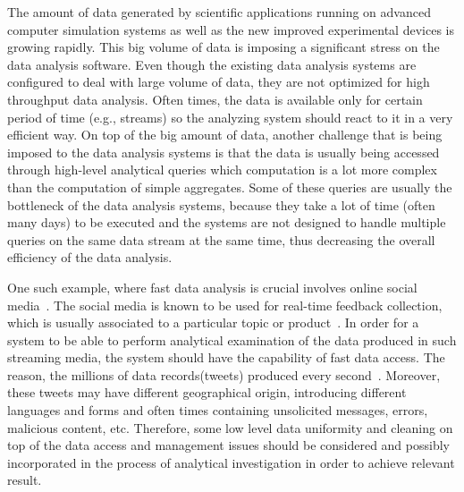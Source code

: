 \documentclass[10pt,journal,final,letterpaper,twocolumn]{IEEEtran}
\begin{document}
The amount of data generated by scientific applications running on
advanced computer simulation systems as well as the new improved
experimental devices is growing rapidly. This big volume of data is
imposing a significant stress on the data analysis software. Even
though the existing data analysis systems are configured to deal
with large volume of data, they are not optimized for high
throughput data analysis. Often times, the data is available only
for certain period of time (e.g., streams) so the analyzing system
should react to it in a very efficient way. On top of the big amount
of data, another challenge that is being imposed to the data
analysis systems is that the data is usually being accessed through
high-level analytical queries which computation is a lot more
complex than the computation of simple aggregates. Some of these
queries are usually the bottleneck of the data analysis systems,
because they take a lot of time (often many days) to be executed and
the systems are not designed to handle multiple queries on the same
data stream at the same time, thus decreasing the overall efficiency
of the data analysis.

One such example, where fast data analysis is crucial involves
online social
media~\cite{nature_bigdata08,nature_bigdata12,science_social10}. The
social media is known to be used for real-time feedback collection,
which is usually associated to a particular topic or
product~\cite{jcs_twitter11}. In order for a system to be able to
perform analytical examination of the data produced in such
streaming media, the system should have the capability of fast data
access. The reason, the millions of data records(tweets) produced
every second~\cite{tkde_big14}. Moreover, these tweets may have
different geographical origin, introducing different languages and
forms and often times containing unsolicited messages, errors,
malicious content, etc. Therefore, some low level data uniformity
and cleaning on top of the data access and management issues should
be considered and possibly incorporated in the process of analytical
investigation in order to achieve relevant result.
\end{document}
